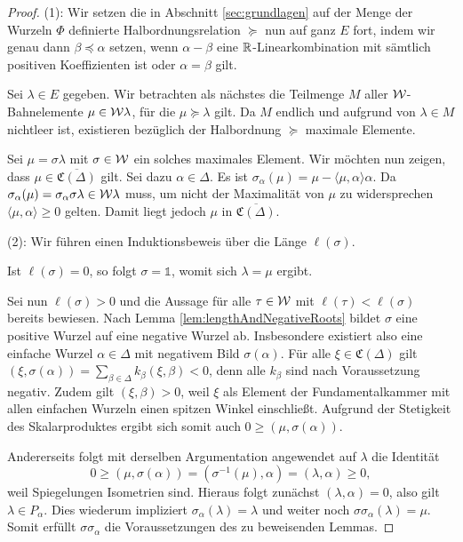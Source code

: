 \begin{proof}
  (1):
  Wir setzen die in Abschnitt \ref{sec:grundlagen} auf der Menge der Wurzeln $\Phi$ definierte Halbordnungsrelation $\succeq$ nun auf ganz $E$ fort, indem wir genau dann $\beta \preceq \alpha$ setzen, wenn $\alpha - \beta$ eine $\mathbb{R}$-Linearkombination mit sämtlich positiven Koeffizienten ist oder $\alpha = \beta$ gilt.

  Sei $\lambda \in E$ gegeben. 
  Wir betrachten als nächstes die Teilmenge $M$ aller $\mathcal{W}$\hyp{}Bahnelemente $\mu \in \mathcal{W}\lambda$, für die $\mu \succeq \lambda$ gilt.
  Da $M$ endlich und aufgrund von $\lambda \in M$ nichtleer ist, existieren bezüglich der Halbordnung $\succeq$ maximale Elemente.

  Sei $\mu = \sigma\lambda$ mit $\sigma \in \mathcal{W}$ ein solches maximales Element.
  Wir möchten nun zeigen, dass $\mu \in \overline{\mathfrak{C}(\Delta)}$ gilt.
  Sei dazu $\alpha \in \Delta$.
  Es ist $\sigma_\alpha(\mu) = \mu - \langle \mu, \alpha \rangle \alpha$.
  Da $\sigma_\alpha(\mu) = \sigma_\alpha \sigma \lambda \in \mathcal{W}\lambda$ muss, um nicht der Maximalität von $\mu$ zu widersprechen $\langle \mu, \alpha \rangle \geq 0$ gelten.
  Damit liegt jedoch $\mu$ in $\overline{\mathfrak{C}(\Delta)}$.

  (2):
  Wir führen einen Induktionsbeweis über die Länge $\ell(\sigma)$.

  Ist $\ell(\sigma) = 0$, so folgt $\sigma = \mathds{1}$, womit sich $\lambda = \mu$ ergibt.

  Sei nun $\ell(\sigma) > 0$ und die Aussage für alle $\tau \in \mathcal{W}$ mit $\ell(\tau) < \ell(\sigma)$ bereits bewiesen.
  Nach Lemma \ref{lem:lengthAndNegativeRoots} bildet $\sigma$ eine positive Wurzel auf eine negative Wurzel ab.
  Insbesondere existiert also eine einfache Wurzel $\alpha \in \Delta$ mit negativem Bild $\sigma(\alpha)$.
  Für alle $\xi \in \mathfrak{C}(\Delta)$ gilt $(\xi, \sigma(\alpha)) = \sum_{\beta \in \Delta} k_\beta (\xi,\beta) < 0$, denn alle $k_\beta$ sind nach Voraussetzung negativ.  
  Zudem gilt $(\xi,\beta) > 0$, weil $\xi$ als Element der Fundamentalkammer mit allen einfachen Wurzeln einen spitzen Winkel einschließt.
  Aufgrund der Stetigkeit des Skalarproduktes ergibt sich somit auch $0 \geq (\mu, \sigma(\alpha))$.
  
  Andererseits folgt mit derselben Argumentation angewendet auf $\lambda$ die Identität
  \begin{displaymath}
    0 \geq (\mu, \sigma(\alpha)) = (\sigma^{-1}(\mu), \alpha) = (\lambda, \alpha) \geq 0,
  \end{displaymath}
  weil Spiegelungen Isometrien sind.
  Hieraus folgt zunächst $(\lambda, \alpha) = 0$, also gilt $\lambda \in P_\alpha$.
  Dies wiederum impliziert $\sigma_\alpha(\lambda) = \lambda$ und weiter noch $\sigma \sigma_\alpha(\lambda) = \mu$.
  Somit erfüllt $\sigma \sigma_\alpha$ die Voraussetzungen des zu beweisenden Lemmas. 


\end{proof}
